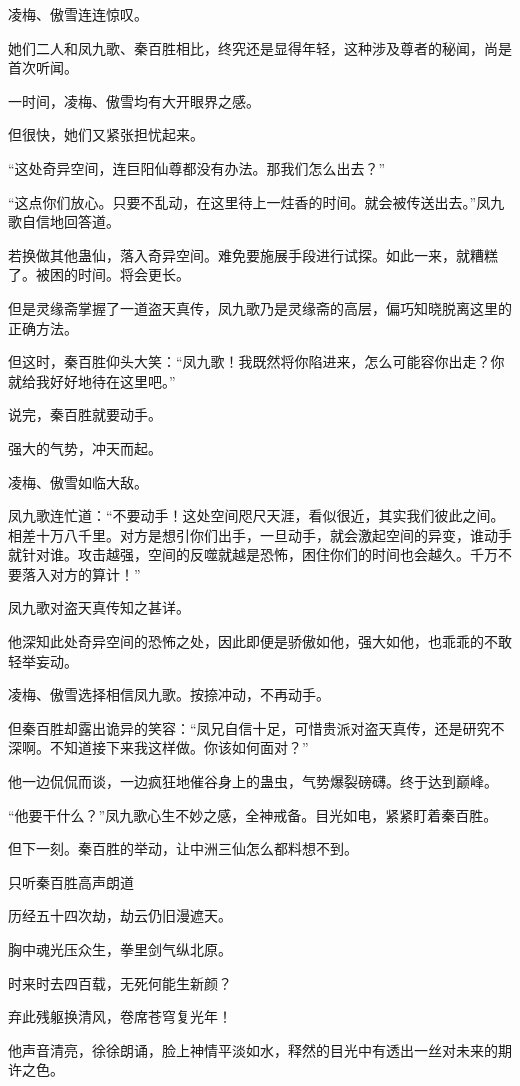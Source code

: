 \begin{this_body}
凌梅、傲雪连连惊叹。

她们二人和凤九歌、秦百胜相比，终究还是显得年轻，这种涉及尊者的秘闻，尚是首次听闻。

一时间，凌梅、傲雪均有大开眼界之感。

但很快，她们又紧张担忧起来。

“这处奇异空间，连巨阳仙尊都没有办法。那我们怎么出去？”

“这点你们放心。只要不乱动，在这里待上一炷香的时间。就会被传送出去。”凤九歌自信地回答道。

若换做其他蛊仙，落入奇异空间。难免要施展手段进行试探。如此一来，就糟糕了。被困的时间。将会更长。

但是灵缘斋掌握了一道盗天真传，凤九歌乃是灵缘斋的高层，偏巧知晓脱离这里的正确方法。

但这时，秦百胜仰头大笑：“凤九歌！我既然将你陷进来，怎么可能容你出走？你就给我好好地待在这里吧。”

说完，秦百胜就要动手。

强大的气势，冲天而起。

凌梅、傲雪如临大敌。

凤九歌连忙道：“不要动手！这处空间咫尺天涯，看似很近，其实我们彼此之间。相差十万八千里。对方是想引你们出手，一旦动手，就会激起空间的异变，谁动手就针对谁。攻击越强，空间的反噬就越是恐怖，困住你们的时间也会越久。千万不要落入对方的算计！”

凤九歌对盗天真传知之甚详。

他深知此处奇异空间的恐怖之处，因此即便是骄傲如他，强大如他，也乖乖的不敢轻举妄动。

凌梅、傲雪选择相信凤九歌。按捺冲动，不再动手。

但秦百胜却露出诡异的笑容：“凤兄自信十足，可惜贵派对盗天真传，还是研究不深啊。不知道接下来我这样做。你该如何面对？”

他一边侃侃而谈，一边疯狂地催谷身上的蛊虫，气势爆裂磅礴。终于达到巅峰。

“他要干什么？”凤九歌心生不妙之感，全神戒备。目光如电，紧紧盯着秦百胜。

但下一刻。秦百胜的举动，让中洲三仙怎么都料想不到。

只听秦百胜高声朗道

历经五十四次劫，劫云仍旧漫遮天。

胸中魂光压众生，拳里剑气纵北原。

时来时去四百载，无死何能生新颜？

弃此残躯换清风，卷席苍穹复光年！

他声音清亮，徐徐朗诵，脸上神情平淡如水，释然的目光中有透出一丝对未来的期许之色。


\end{this_body}
